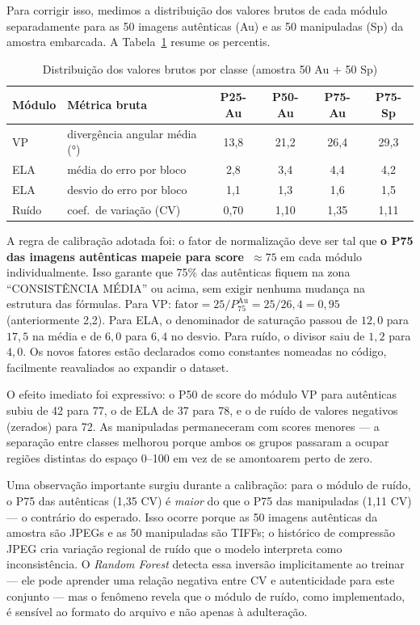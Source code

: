 \documentclass[12pt]{article}
\begin{document}
Para corrigir isso, medimos a distribuição dos valores brutos de cada módulo
separadamente para as 50 imagens autênticas (Au) e as 50 manipuladas (Sp) da
amostra embarcada. A Tabela~\ref{tab:rawdist} resume os percentis.

\begin{table}[ht]
\centering
\caption{Distribuição dos valores brutos por classe (amostra 50 Au + 50 Sp)}
\label{tab:rawdist}
\begin{tabular}{llcccc}
\toprule
\textbf{Módulo} & \textbf{Métrica bruta} & \textbf{P25-Au} & \textbf{P50-Au} & \textbf{P75-Au} & \textbf{P75-Sp} \\
\midrule
VP    & divergência angular média (°) & 13,8 & 21,2 & 26,4 & 29,3 \\
ELA   & média do erro por bloco       &  2,8 &  3,4 &  4,4 &  4,2 \\
ELA   & desvio do erro por bloco      &  1,1 &  1,3 &  1,6 &  1,5 \\
Ruído & coef.\ de variação (CV)       &  0,70&  1,10&  1,35&  1,11 \\
\bottomrule
\end{tabular}
\end{table}

A regra de calibração adotada foi: o fator de normalização deve ser tal que
\textbf{o P75 das imagens autênticas mapeie para score~$\approx 75$} em cada
módulo individualmente. Isso garante que 75\% das autênticas fiquem na zona
``CONSISTÊNCIA MÉDIA'' ou acima, sem exigir nenhuma mudança na estrutura das
fórmulas. Para VP:
$\text{fator} = 25 / P_{75}^{\text{Au}} = 25 / 26{,}4 = 0{,}95$
(anteriormente 2,2). Para ELA, o denominador de saturação passou de $12{,}0$
para $17{,}5$ na média e de $6{,}0$ para $6{,}4$ no desvio. Para ruído, o
divisor saiu de $1{,}2$ para $4{,}0$. Os novos fatores estão declarados como
constantes nomeadas no código, facilmente reavaliados ao expandir o dataset.

O efeito imediato foi expressivo: o P50 de score do módulo VP para autênticas
subiu de 42 para 77, o de ELA de 37 para 78, e o de ruído de valores negativos
(zerados) para 72. As manipuladas permaneceram com scores menores --- a
separação entre classes melhorou porque ambos os grupos passaram a ocupar regiões
distintas do espaço 0--100 em vez de se amontoarem perto de zero.

Uma observação importante surgiu durante a calibração: para o módulo de ruído,
o P75 das autênticas (1,35 CV) é \emph{maior} do que o P75 das manipuladas
(1,11 CV) --- o contrário do esperado. Isso ocorre porque as 50 imagens
autênticas da amostra são JPEGs e as 50 manipuladas são TIFFs; o histórico de
compressão JPEG cria variação regional de ruído que o modelo interpreta como
inconsistência. O \textit{Random Forest} detecta essa inversão implicitamente ao
treinar --- ele pode aprender uma relação negativa entre CV e autenticidade para
este conjunto --- mas o fenômeno revela que o módulo de ruído, como implementado,
é sensível ao formato do arquivo e não apenas à adulteração.
\end{document}
